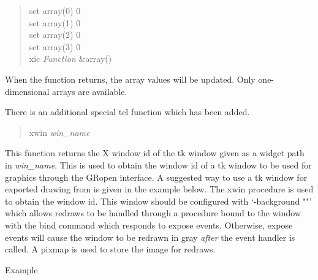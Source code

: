 \begin{quote}\vt
set array(0) 0\\
set array(1) 0\\
set array(2) 0\\
set array(3) 0\\
xic {\it Function} \&array()
\end{quote}

When the function returns, the array values will be updated.  Only
one-dimensional arrays are available.

There is an additional special {\et tcl} function which has been added.
\begin{quote}
{\vt xwin} {\it win\_name}
\end{quote}
This function returns the X window id of the {\et tk} window given as
a widget path in {\it win\_name}.  This is used to obtain the window
id of a {\et tk} window to be used for {\Xic} graphics through the
{\vt GRopen} interface.  A suggested way to use a {\et tk} window for
exported drawing from {\Xic} is given in the example below.  The {\vt
xwin} procedure is used to obtain the window id.  This window should
be configured with `{\vt -background ""}' which allows redraws to be
handled through a procedure bound to the window with the {\vt bind}
command which responds to expose events.  Otherwise, expose events
will cause the window to be redrawn in gray {\it after} the event
handler is called.  A pixmap is used to store the image for redraws.

Example

